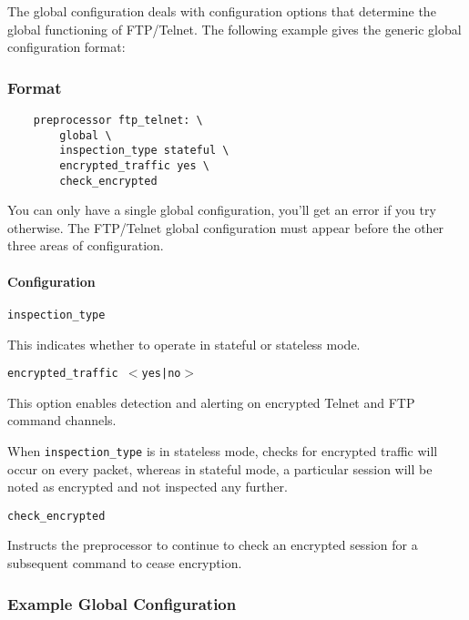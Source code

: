 \documentclass[english]{report}
\newcounter{slistnum}
\newenvironment{slist}
{ \begin{list}{ {\bf \arabic{slistnum}.} }{\usecounter{slistnum} } }
{ \end{list} }
\newenvironment{note}{
\samepage
    \vspace{10pt}{\textsf{
        {\hspace{7pt}\Huge{$\triangle$\hspace{-12.5pt}{\Large{$^!$}}}}\hspace{5pt}
        {\Large{NOTE}}
    }
    }
   \begin{center}
    \par\vspace{-17pt}

    \begin{lrbox}{\savepar}
    \begin{minipage}[r]{6in}
}
{
    \end{minipage}
    \end{lrbox}
    \fbox{
        \usebox{
            \savepar
	}
    }
    \par\vskip10pt
    \end{center}
}
\newenvironment{note}{
        \begin{rawhtml}
        <p><table border="1"><tr><td><b>
        Note:&nbsp;&nbsp;</b>
        \end{rawhtml}
}{
        \begin{rawhtml}
        </b></td></tr></table></p>
        \end{rawhtml}
}
\begin{document}
The global configuration deals with configuration options that determine the
global functioning of FTP/Telnet.  The following example gives the generic
global configuration format:

\subsubsection{Format}

\begin{verbatim}
    preprocessor ftp_telnet: \
        global \
        inspection_type stateful \
        encrypted_traffic yes \
        check_encrypted
\end{verbatim}

You can only have a single global configuration, you'll get an error if you try
otherwise.  The FTP/Telnet global configuration must appear before the other
three areas of configuration.

\paragraph{Configuration}
\begin{slist}
\item \texttt{inspection\_type}

This indicates whether to operate in stateful or stateless mode.

\item \texttt{encrypted\_traffic $<$yes|no$>$}

This option enables detection and alerting on encrypted Telnet and FTP command
channels.

\begin{note}

When \texttt{inspection\_type} is in stateless mode, checks for encrypted
traffic will occur on every packet, whereas in stateful mode, a particular
session will be noted as encrypted and not inspected any further.

\end{note}

\item \texttt{check\_encrypted}

Instructs the preprocessor to continue to check an encrypted session for a
subsequent command to cease encryption.

\end{slist}

\subsubsection{Example Global Configuration}
\end{document}
